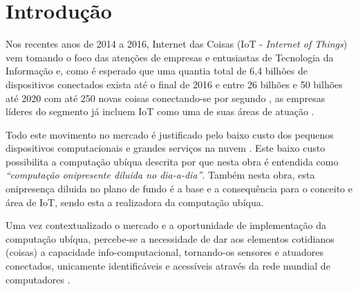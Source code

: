 \chapter[Introdução]{Introdução}

Nos recentes anos de 2014 a 2016, Internet das Coisas (IoT - \emph{Internet of
Things}) vem tomando o foco das atenções de empresas e entusiastas de Tecnologia
da Informação \cite{DzoneIoT:2015} e, como é esperado que uma quantia total de
6,4 bilhões de dispositivos conectados exista até o final de 2016
\cite{GARTNER2015} e entre 26 bilhões \cite{GARTNER2014} e 50 bilhões até 2020
com até 250 novas coisas conectando-se por segundo \cite{CiscoBlog2013}, as
empresas líderes do segmento já incluem IoT como uma de suas áreas de atuação
\cite{Ibm2016, ARM-mbed, Microsoft2016, Intel2016, Oracle2016, Google2016,
AmazonIoT2016}.

Todo este movimento no mercado é justificado pelo baixo custo dos pequenos
dispositivos computacionais \cite{RpiZeroLaunch, Esp8266.net} e grandes serviços
na nuvem \cite{Kaufmann2015, Amazon2016}. Este baixo custo possibilita a
computação ubíqua descrita por  que nesta obra é
entendida como \emph{``computação onipresente diluida no dia-a-dia''}. Também
nesta obra, esta onipresença diluida no plano de fundo é a  base e a
consequência para o conceito e área de IoT, sendo esta a realizadora da
computação ubíqua.

Uma vez contextualizado o mercado e a oportunidade de implementação da
computação ubíqua, percebe-se a necessidade de dar aos elementos cotidianos
(coisas) a capacidade info-computacional, tornando-os sensores e atuadores
conectados, unicamente identificáveis e acessíveis através da rede mundial de
computadores \cite{Lemos2013, Kranenburg2012}.
